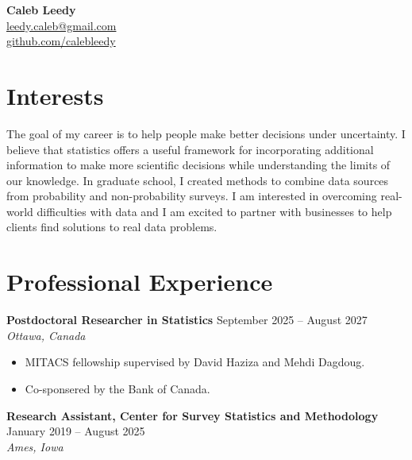 \documentclass[11pt]{article}
\newcommand{\name}[1]{{\LARGE \bfseries #1}}
\newcommand{\entry}[3]{%
  \noindent\textbf{#1} \hfill #3\\
  \textit{#2}\\[4pt]
}
\begin{document}
\name{Caleb Leedy}\\[2pt]
\href{mailto:leedy.caleb@gmail.com}{leedy.caleb@gmail.com} \\
\href{https://github.com/calebleedy}{github.com/calebleedy}

\vspace{6pt}

\section*{Interests}
The goal of my career is to help people make better decisions under uncertainty.
I believe that statistics offers a useful framework for incorporating additional
information to make more scientific decisions while understanding the limits of
our knowledge. In graduate school, I created methods to combine data sources from
probability and non-probability surveys. I am interested in overcoming real-world
difficulties with data and I am excited to partner with businesses to help clients
find solutions to real data problems.

\section*{Professional Experience}
\entry{Postdoctoral Researcher in Statistics}{Ottawa, Canada}{September 2025 --
August 2027}
\vspace{-16pt}
\begin{itemize}[leftmargin=2em,itemsep=-4pt,topsep=2pt]
  \item MITACS fellowship supervised by David Haziza and Mehdi Dagdoug. 
  \item Co-sponsered by the Bank of Canada.
\end{itemize}
\vspace{6pt}

\entry{Research Assistant, Center for Survey Statistics and Methodology}{Ames, Iowa}{January 2019 -- August 2025}
\end{document}
